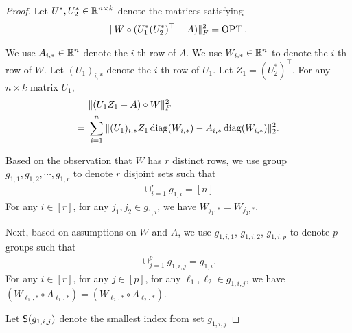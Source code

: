 \begin{proof}

Let $U_1^*, U_2^* \in \R^{n \times k}$ denote the matrices satisfying 
\begin{align*}
    \| W \circ (U_1^* (U_2^*)^\top - A) \|_F^2 = \OPT.
\end{align*}


We use $A_{i,*} \in \R^n$ denote the $i$-th row of $A$. We use $W_{i,*} \in \R^n$ to denote the $i$-th row of $W$. Let $(U_1)_{i,*}$ denote the $i$-th row of $U_1$. Let $Z_1 = (U_2^*)^\top$.  
For any $n \times k$ matrix $U_1$,
\begin{align*}
 & ~ \| (U_1 Z_1 - A) \circ W \|_F^2 \\
 = & ~ \sum_{i=1}^n \| (U_1)_{i,*} Z_1 \diag( W_{i,*} ) - A_{i,*} \diag( W_{i,*} ) \|_2^2.
\end{align*}

Based on the observation that $W$ has $r$ distinct rows, we use group $g_{1,1}, g_{1,2}, \cdots , g_{1,r}$ to denote $r$ disjoint sets such that
\begin{align*}
    \cup_{i=1}^r g_{1,i} = [n]
\end{align*}
For any $i \in [r]$, for any $j_1, j_2 \in g_{1,i}$, we have $W_{j_1,*} = W_{j_2,*}$.

Next, based on assumptions on $W$ and $A$, we use $g_{1,i,1}$, $g_{1,i,2}$, $g_{1,i,p}$ to denote $p$ groups such that 
\begin{align*}
    \cup_{j=1}^p g_{1,i,j} = g_{1,i} .
\end{align*}
For any $i \in [r]$, for any $j \in [p]$, for any $\ell_1, \ell_2 \in g_{1,i,j}$, we have  $(W_{\ell_1,*} \circ A_{\ell_1,*}) = (W_{\ell_2,*} \circ A_{\ell_2,*})$.

Let $\S(g_{1,i,j})$ denote the smallest index from set $g_{1,i,j}$


\end{proof}
